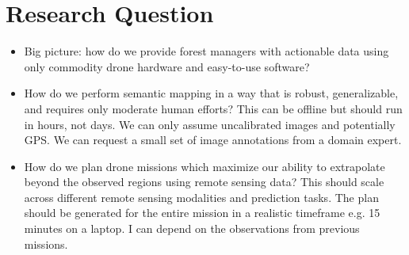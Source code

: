 
\chapter{Research Question} \label{chapResearchQuestion}

\begin{itemize}
    \item Big picture: how do we provide forest managers with actionable data using only commodity drone hardware and easy-to-use software?
    \item How do we perform semantic mapping in a way that is robust, generalizable, and requires only moderate human efforts? This can be offline but should run in hours, not days. We can only assume uncalibrated images and potentially GPS. We can request a small set of image annotations from a domain expert. 
    \item How do we plan drone missions which maximize our ability to extrapolate beyond the observed regions using remote sensing data? This should scale across different remote sensing modalities and prediction tasks. The plan should be generated for the entire mission in a realistic timeframe e.g. 15 minutes on a laptop. I can depend on the observations from previous missions.
\end{itemize}